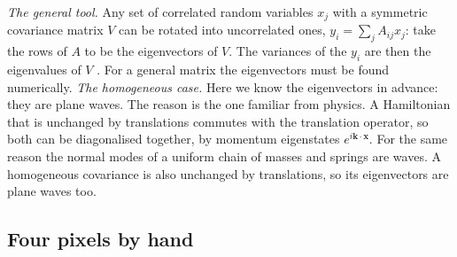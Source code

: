 \emph{The general tool.} Any set of correlated random variables $x_j$ with a
symmetric covariance matrix $V$ can be rotated into uncorrelated ones,
$y_i=\sum_jA_{ij}x_j$: take the rows of $A$ to be the eigenvectors of $V$. The
variances of the $y_i$ are then the eigenvalues of $V$
. For a general matrix the eigenvectors
must be found numerically.
\emph{The homogeneous case.} Here we know the eigenvectors in advance: they are
plane waves. The reason is the one familiar from physics. A Hamiltonian that is
unchanged by translations commutes with the translation operator, so both can be
diagonalised together, by momentum eigenstates $e^{i\bm k\cdot\bm x}$. For the
same reason the normal modes of a uniform chain of masses and springs are waves.
A homogeneous covariance is also unchanged by translations, so its eigenvectors
are plane waves too.

\subsection{Four pixels by hand}
\label{7a:sec:circulant}


